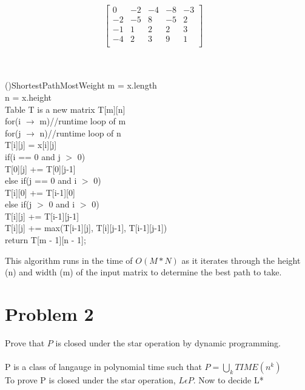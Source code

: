 \documentclass[12pt]{article}
\begin{document}
$$
\begin{bmatrix} 
0  & -2 & -4 & -8 & -3 \\
-2 & -5 & 8  & -5 & 2  \\
-1 & 1  & 2  &  2 & 3  \\
-4 & 2  & 3  &  9 & 1  \\
\end{bmatrix}
\quad
$$
\\\\
\begin{algorithm}[H]
    \Fn(){ShortestPathMostWeight}{
    \SetAlgoLined
    \SetNoFillComment
    \DontPrintSemicolon
    m = x.length\\
    n = x.height\\
    Table T is a new matrix T[m][n]\\
    for(i $\rightarrow$ m){//runtime loop of m\\ 
        \hspace{.5cm}for(j $\rightarrow$ n){//runtime loop of n\\
            \hspace{1cm}T[i][j] = x[i][j]\\
            \hspace{1cm}if(i == 0 and j $>$ 0){\\
                \hspace{1.5cm}T[0][j] += T[0][j-1]\\
            }
            \hspace{1cm}else if(j == 0 and i $>$ 0){\\
                \hspace{1.5cm}T[i][0] += T[i-1][0]\\
            }
            \hspace{1cm}else if(j $>$ 0 and i $>$ 0){\\
            \hspace{1.5cm}T[i][j] += T[i-1][j-1]\\
            }
            \hspace{1cm}T[i][j] += max(T[i-1][j], T[i][j-1], T[i-1][j-1])\\
        }
    }
    return T[m - 1][n - 1];
    }
\end{algorithm}
This algorithm runs in the time of $O(M*N)$ as it iterates through the height (n) and width (m) of the input matrix to determine the best path to take.
\bigskip
\section*{Problem 2}
Prove that $P$ is closed under the star operation by dynamic programming.
\\\\
P is a class of langauge in polynomial time such that $P=\bigcup_k TIME(n^k)$\\To prove P is closed under the star operation, $L\epsilon P$. Now to decide L*\\
\\
\end{document}
